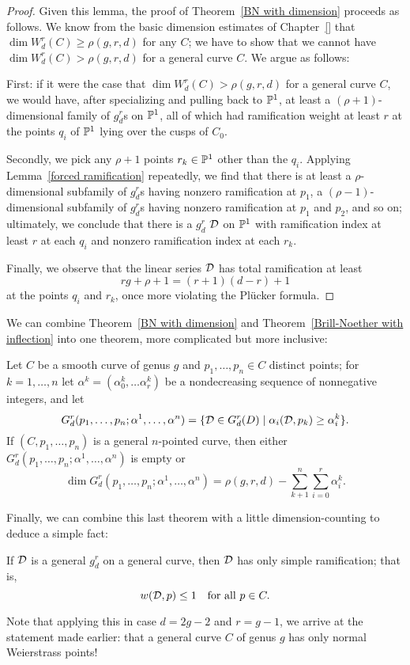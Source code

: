 \begin{proof}
Given this lemma, the proof of Theorem~\ref{BN with dimension} proceeds as follows. We know from the basic dimension estimates of Chapter~\ref{} that $\dim W^r_d(C) \geq \rho(g,r,d)$ for any $C$; we have to show that we cannot have $\dim W^r_d(C) > \rho(g,r,d)$ for a general curve $C$. We argue as follows:

First: if it were the case that $\dim W^r_d(C) > \rho(g,r,d)$ for a general curve $C$, we would have, after specializing and pulling back to ${\mathbb P}^1$, at least a $(\rho + 1)$-dimensional family of $g^r_d$s on ${\mathbb P}^1$, all of which had ramification weight at least $r$ at the points $q_i$ of ${\mathbb P}^1$ lying over the cusps of $C_0$. 

Secondly, we pick any $\rho + 1$ points $r_k \in {\mathbb P}^1$ other than the $q_i$. Applying Lemma~\ref{forced ramification} repeatedly, we find that there is at least a $\rho$-dimensional subfamily of $g^r_d$s having nonzero ramification at $p_1$, a $(\rho - 1)$-dimensional subfamily of $g^r_d$s having nonzero ramification at $p_1$ and $p_2$, and so on; ultimately, we conclude that there is a $g^r_d$ ${\cal D}$ on ${\mathbb P}^1$ with ramification index at least $r$ at each $q_i$ and nonzero ramification index at each $r_k$. 

Finally, we observe that the linear series ${\cal D}$ has total ramification at least
$$
rg + \rho + 1 = (r+1)(d-r)+1
$$
at the points $q_i$ and $r_k$, once more violating the Pl\"ucker formula.
\end{proof}

We can combine Theorem~\ref{BN with dimension} and Theorem~\ref{Brill-Noether with inflection} into one theorem, more complicated but more inclusive:

\begin{theorem}\label{BN with inflection and dimension}
Let $C$ be a smooth curve of genus $g$ and $p_1,\dots,p_n \in C$ distinct points; for $k = 1,\dots,n$ let $\alpha^k = (\alpha^k_0,\dots\alpha^k_r)$ be a nondecreasing sequence of nonnegative integers, and let
$$
G^r_d(p_1,\dots,p_n; \alpha^1,\dots,\alpha^n) = \{{\cal D} \in G^r_d(D) \mid \alpha_i({\cal D}, p_k) \geq \alpha^k_i \}.
$$
If $(C, p_1,\dots,p_n)$ is a general $n$-pointed curve, then either $G^r_d(p_1,\dots,p_n; \alpha^1,\dots,\alpha^n)$ is empty or
$$
\dim G^r_d(p_1,\dots,p_n; \alpha^1,\dots,\alpha^n) = \rho(g,r,d) - \sum_{k+1}^n \sum_{i=0}^r \alpha^k_i.
$$
\end{theorem}

Finally, we can combine this last theorem with a little dimension-counting to deduce a simple fact:

\begin{theorem}
If ${\cal D}$ is a general $g^r_d$ on a general curve, then ${\cal D}$ has only simple ramification; that is,
$$
w({\cal D}, p) \leq 1 \quad \text{for all } p \in C.
$$
\end{theorem}

Note that applying this in case $d=2g-2$ and $r = g-1$, we arrive at the statement made earlier: that a general curve $C$ of genus $g$ has only normal Weierstrass points!


